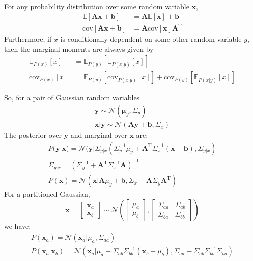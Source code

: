 \documentclass[a4paper]{article}
\begin{document}
For any probability distribution over some random variable $\mathbf{x}$, 
\begin{align*}
\mathbb{E}\left[\mathbf{Ax}+\mathbf{b}\right] &= \mathbf{A}\mathbb{E}[\mathbf{x}] + \mathbf{b} \\
\textrm{cov}\left[\mathbf{Ax}+\mathbf{b}\right] &= \mathbf{A}\textrm{cov}[\mathbf{x}]\mathbf{A}^\textrm{T}
\end{align*}
Furthermore, if $x$ is conditionally dependent on some other random variable $y$, then the marginal moments are always given by
\begin{align*}
\mathbb{E}_{P(x)}[x] &= \mathbb{E}_{P(y)}\left[\mathbb{E}_{P(x|y)}[x]\right] \\
\textrm{cov}_{P(x)}[x] &= \mathbb{E}_{P(y)}\left[\textrm{cov}_{P(x|y)}[x]\right] + \textrm{cov}_{P(y)}\left[\mathbb{E}_{P(x|y)}[x]\right]
\end{align*}


So, for a pair of Gaussian random variables
\begin{gather*}
\mathbf{y} \sim  \mathcal{N}(\mathbf{\mu}_y,\Sigma_y)\\
\mathbf{x}|\mathbf{y} \sim \mathcal{N}(\mathbf{A}\mathbf{y}+\mathbf{b},\Sigma_x)
\end{gather*}
The posterior over $\mathbf{y}$ and marginal over $\mathbf{x}$ are:
\begin{gather*}
P(\mathbf{y}|\mathbf{x}) = \mathcal{N}(\mathbf{y}|\Sigma_{y|x}(\Sigma_y^{-1}\mu_y + \mathbf{A}^\textrm{T}\Sigma_x^{-1}(\mathbf{x} - \mathbf{b}), \Sigma_{y|x}) \\
\Sigma_{y|x} = (\Sigma_y^{-1} + \mathbf{A}^\textrm{T}\Sigma_x^{-1}\mathbf{A})^{-1} \\
P(\mathbf{x}) = \mathcal{N}(\mathbf{x}|\mathbf{A}\mu_y + \mathbf{b}, \Sigma_x + \mathbf{A}\Sigma_y \mathbf{A}^\textrm{T})
\end{gather*}
For a partitioned Gaussian,
\[
\mathbf{x}=
\begin{bmatrix} 
\mathbf{x}_a \\
\mathbf{x}_b
\end{bmatrix}
\sim \mathcal{N}\left(
\begin{bmatrix}
\mu_a \\
\mu_b
\end{bmatrix}
,
\begin{bmatrix}
\Sigma_{aa} & \Sigma_{ab} \\
\Sigma_{ba} & \Sigma_{bb}
\end{bmatrix}
\right)
\]
we have:
\begin{gather*}
P(\mathbf{x}_a) = \mathcal{N}(\mathbf{x}_a|\mu_a,\Sigma_{aa}) \\
P(\mathbf{x}_a|\mathbf{x}_b) = \mathcal{N}(\mathbf{x}_a|\mu_a + \Sigma_{ab}\Sigma_{bb}^{-1}(\mathbf{x}_b - \mu_b), \Sigma_{aa} - \Sigma_{ab}\Sigma_{bb}^{-1}\Sigma_{ba})
\end{gather*}
\end{document}
